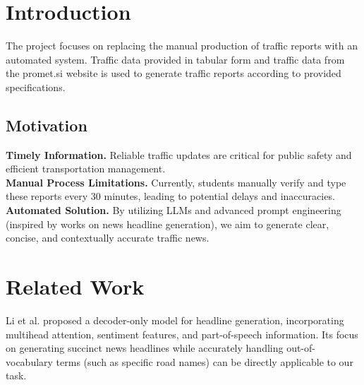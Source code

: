 \documentclass[fleqn,moreauthors,10pt]{ds_report}
\affiliation{\textit{Advisors: Slavko Žitnik, Aleš Žagar}}
\begin{document}
\flushbottom 

\maketitle 

\thispagestyle{empty} 


\section*{Introduction}
The project focuses on replacing the manual production of traffic reports with an automated system. Traffic data provided in tabular form and traffic data from the promet.si website is used to generate traffic reports according to provided specifications.

\subsection*{Motivation}

\textbf{Timely Information.} Reliable traffic updates are critical for public safety and efficient transportation management.\\
\textbf{Manual Process Limitations.} Currently, students manually verify and type these reports every 30 minutes, leading to potential delays and inaccuracies.\\
\textbf{Automated Solution.} By utilizing LLMs and advanced prompt engineering (inspired by works on news headline generation), we aim to generate clear, concise, and contextually accurate traffic news.

\section{Related Work}

Li et al. \cite{liHGNewsNewsHeadline2021} proposed a decoder-only model for headline generation,
incorporating multihead attention, sentiment features, and part-of-speech information. Its focus
on generating succinct news headlines while accurately handling out-of-vocabulary
terms (such as specific road names) can be directly applicable to our task.
\end{document}
